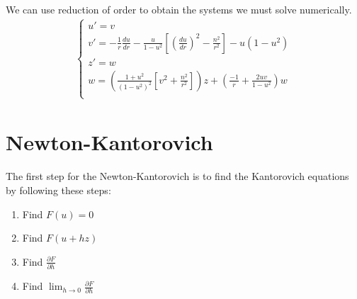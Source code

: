 \documentclass{article}
\begin{document}
We can use reduction of order to obtain the systems we must solve numerically. 
\begin{align}
\begin{cases}
u' = v \\
v' = -\frac{1}{r}\frac{du}{dr} - \frac{u}{1-u^2}\left[\left(\frac{du}{dr}\right)^2 - \frac{n^2}{r^2}\right] - u(1-u^2) \\
z' = w \\
w = \left(\frac{1+u^2}{(1-u^2)^2}\left[ v^2 + \frac{n^2}{r^2} \right] \right)z + \left(\frac{-1}{r} + \frac{2uv}{1-u^2}\right)w \\
\end{cases}
\end{align}
\section{Newton-Kantorovich}
The first step for the Newton-Kantorovich is to find the Kantorovich equations by following these steps:
\begin{enumerate}


\item Find $F(u) = 0$
\item Find $F(u + hz)$
\item Find $\frac{\partial F}{\partial h}$
\item Find $\lim_{h\rightarrow 0} \frac{\partial F}{\partial h}$
\end{enumerate}
\end{document}
